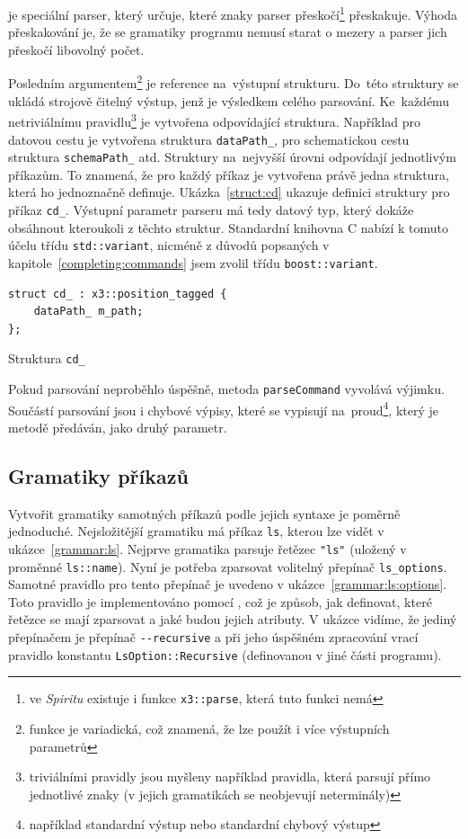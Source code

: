 \documentclass[thesis=B,czech,hidelinks]{FITthesis}[2019/03/06]
\newcommand{\Rplus}{\protect\hspace{-.1em}\protect\raisebox{.35ex}{\smaller{\smaller\textbf{+}}}}
\newcommand{\Cpp}{\mbox{C\Rplus\Rplus}\xspace}
\begin{document}
 je speciální parser, který určuje, které znaky parser přeskočí\footnote{ve \textit{Spiritu} existuje i funkce \texttt{x3::parse}, která tuto funkci nemá} přeskakuje. Výhoda přeskakování je, že se gramatiky programu nemusí starat o mezery a parser jich přeskočí libovolný počet.

Posledním argumentem\footnote{funkce je variadická, což znamená, že lze použít i více výstupních parametrů} je reference na~výstupní strukturu. Do~této struktury se ukládá strojově čitelný výstup, jenž je výsledkem celého parsování. Ke~každému netriviálnímu pravidlu\footnote{triviálními pravidly jsou myšleny například pravidla, která parsují přímo jednotlivé znaky (v jejich gramatikách se neobjevují neterminály)} je vytvořena odpovídající struktura. Například pro datovou cestu je vytvořena struktura \texttt{dataPath\_}, pro schematickou cestu struktura \texttt{schemaPath\_} atd. Struktury na~nejvyšší úrovni odpovídají jednotlivým příkazům. To znamená, že pro každý příkaz je vytvořena právě jedna struktura, která ho jednoznačně definuje. Ukázka~\ref{struct:cd} ukazuje definici struktury pro příkaz \texttt{cd\_}. Výstupní parametr parseru má tedy datový typ, který dokáže obsáhnout kteroukoli z těchto struktur. Standardní knihovna \Cpp{} nabízí k tomuto účelu třídu \texttt{std::variant}, nicméně z důvodů popsaných v kapitole~\ref{completing:commands} jsem zvolil třídu \texttt{boost::variant}.

\begin{listing}
\begin{verbatim}
struct cd_ : x3::position_tagged {
    dataPath_ m_path;
};
\end{verbatim}
\caption{Struktura \texttt{cd\_}}\label{struct:cd}
\end{listing}

Pokud parsování neproběhlo úspěšně, metoda \texttt{parseCommand} vyvolává výjimku. Součástí parsování jsou i chybové výpisy, které se vypisují na~proud\footnote{například standardní výstup nebo standardní chybový výstup}, který je metodě předáván, jako druhý parametr.

\subsection{Gramatiky příkazů}
Vytvořit gramatiky samotných příkazů podle jejich syntaxe je poměrně jednoduché. Nejsložitější gramatiku má příkaz \texttt{ls}, kterou lze vidět v ukázce~\ref{grammar:ls}. Nejprve gramatika parsuje řetězec \verb¨"ls"¨ (uložený v proměnné \verb¨ls::name¨). Nyní je potřeba zparsovat volitelný přepínač \verb¨ls_options¨. Samotné pravidlo pro tento přepínač je uvedeno v ukázce~\ref{grammar:ls:options}. Toto pravidlo je implementováno pomocí , což je způsob, jak definovat, které řetězce se mají zparsovat a jaké budou jejich atributy. V ukázce vidíme, že jediný přepínačem je přepínač \verb¨--recursive¨ a při jeho úspěšném zpracování vrací pravidlo konstantu \texttt{LsOption::Recursive} (definovanou v jiné části programu).
\end{document}
